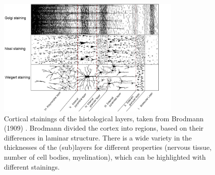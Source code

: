 \begin{figure}[ht]
	\centering
	\includegraphics[width=0.8\textwidth, clip=true]{./Chapters/01_Introduction/Images/Layers}
	\caption{Cortical stainings of the histological layers, taken from Brodmann (1909) \cite{Brodmann1909}. Brodmann divided the cortex into regions, based on their differences in laminar structure. There is a wide variety in the thicknesses of the (sub)layers for different properties (nervous tissue, number of cell bodies, myelination), which can be highlighted with different stainings.}
	\label{fig:layers}
\end{figure}